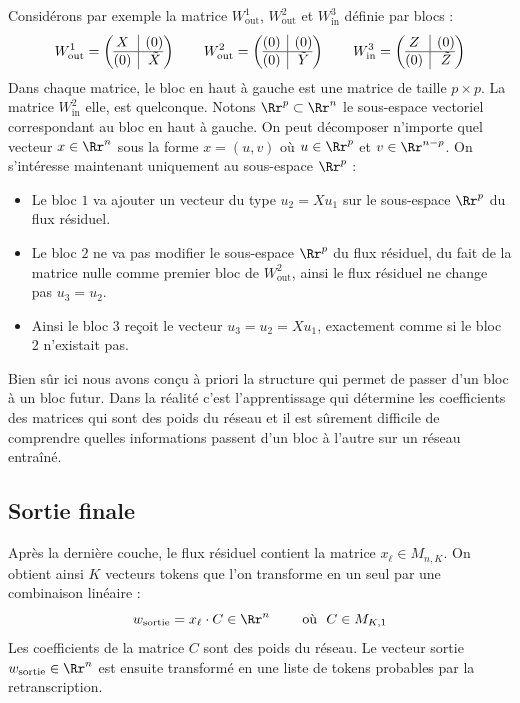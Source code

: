 \documentclass[11pt,class=report,crop=false]{standalone}
\begin{document}
Considérons par exemple la matrice $W_{\text{out}}^1$, $W_{\text{out}}^2$ et $W_{\text{in}}^3$ définie par blocs :
\[
W_{\text{out}}^1 = 
\left(\begin{array}{@{}c|c@{}}
	X & (0)  \\
	\hline
	(0) & \tilde X	
\end{array}\right)
\qquad
W_{\text{out}}^2 = 
\left(\begin{array}{@{}c|c@{}}
	(0) & (0)  \\
	\hline
	(0) & \tilde Y	
\end{array}\right)
\qquad
W_{\text{in}}^3 = 
\left(\begin{array}{@{}c|c@{}}
	Z & (0)  \\
	\hline
	(0) & \tilde Z	
\end{array}\right)
\]
Dans chaque matrice, le bloc en haut à gauche est une matrice de taille $p \times p$.
La matrice $W_{\text{in}}^2$ elle, est quelconque.
Notons $\Rr^p \subset \Rr^n$ le sous-espace vectoriel correspondant au bloc en haut à gauche. On peut décomposer n'importe quel vecteur $x \in \Rr^n$ sous la forme $x = (u, v)$ où $u \in \Rr^p$ et $v \in \Rr^{n-p}$.
On s'intéresse maintenant uniquement au sous-espace $\Rr^p$ :
\begin{itemize}
	\item Le bloc $1$ va ajouter un vecteur du type $u_2 = X u_1$ sur le sous-espace $\Rr^p$ du flux résiduel.
	\item Le bloc $2$ ne va pas modifier le sous-espace $\Rr^p$ du flux résiduel, du fait de la matrice nulle comme premier bloc de $W_{\text{out}}^2$, ainsi le flux résiduel ne change pas $u_3 = u_2$.
	\item Ainsi le bloc $3$ reçoit le vecteur $u_3 = u_2 = X u_1$, exactement comme si le bloc $2$ n'existait pas.
\end{itemize}

Bien sûr ici nous avons conçu à priori la structure qui permet de passer d'un bloc à un bloc futur. Dans la réalité c'est l'apprentissage qui détermine les coefficients des matrices qui sont des poids du réseau et il est sûrement difficile de comprendre quelles informations passent d'un bloc à l'autre sur un réseau entraîné.


\subsection{Sortie finale}


Après la dernière couche, le flux résiduel contient la matrice $x_\ell \in M_{n,K}$.
On obtient ainsi $K$ vecteurs tokens que l'on transforme en un seul par une combinaison linéaire :
$$w_{\text{sortie}} = x_\ell \cdot C  \in \Rr^n \qquad \text{ où } \ C \in M_{K,1}$$
Les coefficients de la matrice $C$ sont des poids du réseau. 
Le vecteur sortie $w_{\text{sortie}} \in \Rr^n$ est ensuite transformé en une liste de tokens probables par la retranscription.
\end{document}
